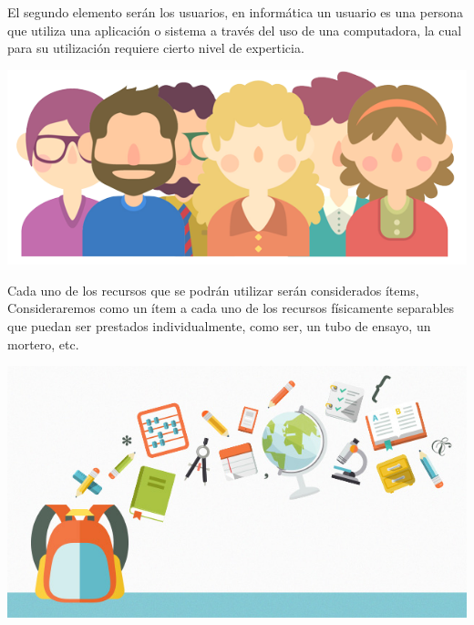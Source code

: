\documentclass[12pt]{article}
\begin{document}
El segundo elemento serán los usuarios, en informática un usuario es una persona que utiliza una aplicación o sistema a través del uso de una computadora, la cual para su utilización requiere cierto nivel de experticia.  
\begin{center}
\vspace{0.5cm}
\includegraphics[scale=0.4]{IMG/usuarios.png} \\ 
\vspace{0.5cm}
\end{center}

Cada uno de los recursos que se podrán utilizar serán considerados ítems,  Consideraremos como un ítem a cada uno de los recursos  físicamente separables que puedan ser prestados individualmente, como ser, un tubo de ensayo, un mortero, etc.  
\begin{center}
\vspace{0.5cm}
\includegraphics[scale=0.4]{IMG/recursos.jpg} \\ 
\vspace{0.5cm}
\end{center}
\end{document}

